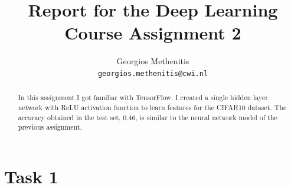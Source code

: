 \documentclass{article}
\title{Report for the Deep Learning Course Assignment 2 }
\author{
  Georgios Methenitis \\
  \texttt{georgios.methenitis@cwi.nl}
}
\begin{document}

\maketitle

\begin{abstract}
In this assignment I got familiar with TensorFlow. I created a single hidden layer network with ReLU activation function to learn features for the CIFAR10 dataset.
The accuracy obtained in the test set, $0.46$, is similar to the neural network model of the previous assignment. 
\end{abstract}

\section{Task 1}
\end{document}
